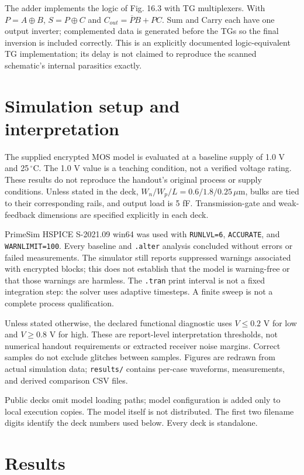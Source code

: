 The adder implements the logic of Fig. 16.3 with TG multiplexers. With $P=A\oplus B$, $S=P\oplus C$ and $C_{out}=\overline P B+PC$. Sum and Carry each have one output inverter; complemented data is generated before the TGs so the final inversion is included correctly. This is an explicitly documented logic-equivalent TG implementation; its delay is not claimed to reproduce the scanned schematic's internal parasitics exactly.

\section{Simulation setup and interpretation}

The supplied encrypted MOS model is evaluated at a baseline supply of 1.0 V and 25\,$^\circ$C. The 1.0 V value is a teaching condition, not a verified voltage rating. These results do not reproduce the handout's original process or supply conditions. Unless stated in the deck, $W_n/W_p/L=0.6/1.8/0.25\,\mu\mathrm m$, bulks are tied to their corresponding rails, and output load is 5 fF. Transmission-gate and weak-feedback dimensions are specified explicitly in each deck.

PrimeSim HSPICE S-2021.09 win64 was used with \texttt{RUNLVL=6}, \texttt{ACCURATE}, and \texttt{WARNLIMIT=100}. Every baseline and \texttt{.alter} analysis concluded without errors or failed measurements. The simulator still reports suppressed warnings associated with encrypted blocks; this does not establish that the model is warning-free or that those warnings are harmless. The \texttt{.tran} print interval is not a fixed integration step: the solver uses adaptive timesteps. A finite sweep is not a complete process qualification.

Unless stated otherwise, the declared functional diagnostic uses $V\leq0.2$ V for low and $V\geq0.8$ V for high. These are report-level interpretation thresholds, not numerical handout requirements or extracted receiver noise margins. Correct samples do not exclude glitches between samples. Figures are redrawn from actual simulation data; \texttt{results/} contains per-case waveforms, measurements, and derived comparison CSV files.

Public decks omit model loading paths; model configuration is added only to local execution copies. The model itself is not distributed. The first two filename digits identify the deck numbers used below. Every deck is standalone.

\section{Results}

